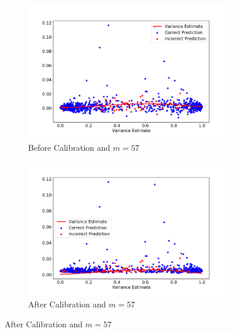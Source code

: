 \documentclass[11pt]{article}
\begin{document}
\begin{figure}[htbp]
	\bigskip
	\begin{subfigure}[b]{0.48\textwidth}
		\centering
		\includegraphics[width=\textwidth]{../figures/BC_Real2.pdf}
		\caption{Before Calibration and $m=57$}
		\label{fig:Before_Calibration_Real_57}
	\end{subfigure}
	\hfill
	\begin{subfigure}[b]{0.48\textwidth}
		\centering
		\includegraphics[width=\textwidth]{../figures/AC_Real2.pdf}
		\caption{After Calibration and $m=57$}
		\label{fig:Calibration_Real_57}
	\end{subfigure}
\end{figure}



\newpage
\end{document}
